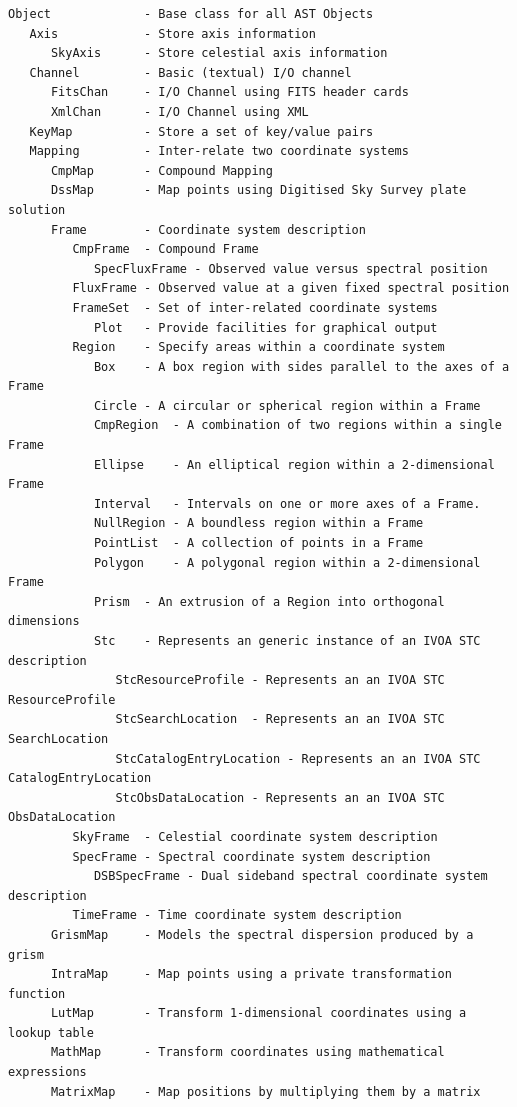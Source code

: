 \documentclass[twoside,11pt]{article}
\begin{document}
\small
\begin{verbatim}
Object             - Base class for all AST Objects
   Axis            - Store axis information
      SkyAxis      - Store celestial axis information
   Channel         - Basic (textual) I/O channel
      FitsChan     - I/O Channel using FITS header cards
      XmlChan      - I/O Channel using XML
   KeyMap          - Store a set of key/value pairs
   Mapping         - Inter-relate two coordinate systems
      CmpMap       - Compound Mapping
      DssMap       - Map points using Digitised Sky Survey plate solution
      Frame        - Coordinate system description
         CmpFrame  - Compound Frame
            SpecFluxFrame - Observed value versus spectral position
         FluxFrame - Observed value at a given fixed spectral position
         FrameSet  - Set of inter-related coordinate systems
            Plot   - Provide facilities for graphical output
         Region    - Specify areas within a coordinate system
            Box    - A box region with sides parallel to the axes of a Frame
            Circle - A circular or spherical region within a Frame
            CmpRegion  - A combination of two regions within a single Frame
            Ellipse    - An elliptical region within a 2-dimensional Frame
            Interval   - Intervals on one or more axes of a Frame.
            NullRegion - A boundless region within a Frame
            PointList  - A collection of points in a Frame
            Polygon    - A polygonal region within a 2-dimensional Frame
            Prism  - An extrusion of a Region into orthogonal dimensions
            Stc    - Represents an generic instance of an IVOA STC description
               StcResourceProfile - Represents an an IVOA STC ResourceProfile
               StcSearchLocation  - Represents an an IVOA STC SearchLocation
               StcCatalogEntryLocation - Represents an an IVOA STC CatalogEntryLocation
               StcObsDataLocation - Represents an an IVOA STC ObsDataLocation
         SkyFrame  - Celestial coordinate system description
         SpecFrame - Spectral coordinate system description
            DSBSpecFrame - Dual sideband spectral coordinate system description
         TimeFrame - Time coordinate system description
      GrismMap     - Models the spectral dispersion produced by a grism
      IntraMap     - Map points using a private transformation function
      LutMap       - Transform 1-dimensional coordinates using a lookup table
      MathMap      - Transform coordinates using mathematical expressions
      MatrixMap    - Map positions by multiplying them by a matrix

\end{verbatim}
\end{document}
